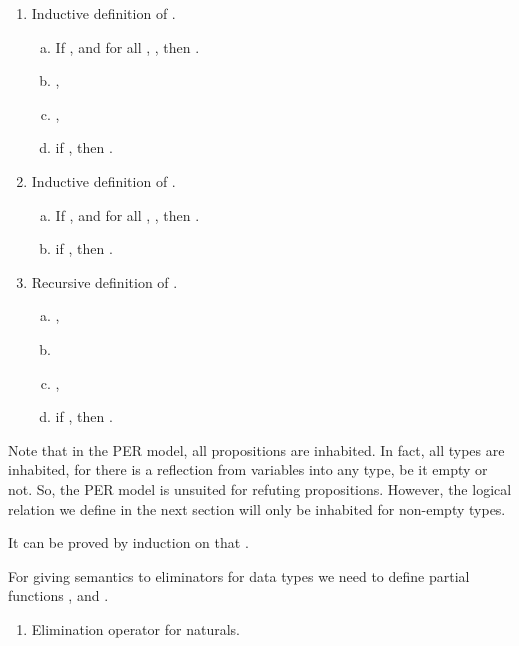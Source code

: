 \documentclass{LMCS}
\begin{document}
{\begin{defi}\hfill
\begin{enumerate}[(1)]
 \item Inductive definition of .
  \begin{enumerate}[(a)]
  \item If , and for all , , then
    .
  \item ,
  \item ,
  \item if , then .
  \end{enumerate}
\item Inductive definition of .
  \begin{enumerate}[(a)]
  \item If , and for all , , then .
  \item if , then .
  \end{enumerate}
\item Recursive definition of .
  \begin{enumerate}[(a)]
\item ,
  \item  
\item ,
  \item if , then .
  \end{enumerate}
\end{enumerate}
\end{defi}\medskip

\noindent Note that in the PER model, all propositions  are inhabited.
In fact, all types are inhabited, for there is a reflection from
variables into any type, be it empty or not.  So, the PER model is
unsuited for refuting propositions.  However, the logical relation we
define in the next section will only be inhabited for non-empty types.

\begin{rem}
  It can be proved by induction on  that .
\end{rem}

\begin{defi}


\end{defi}\medskip






\noindent For giving semantics to eliminators for data types we need to define
partial functions , and .
\begin{defi}[Eliminations on ]\bla
  \label{def:recd}
  \begin{enumerate}[(1)]
  \item Elimination operator for naturals.


\end{enumerate}
\end{defi}}
\end{document}
